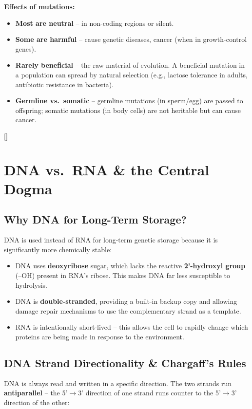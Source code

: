 \documentclass[11pt, letterpaper]{article}
\newcommand{\orangesections}{%
  \titleformat{\section}{\large\bfseries\color{sectionorange}}{}{0em}{}[\color{sectionorange}\titlerule]%
  \titleformat{\subsection}{\normalsize\bfseries\color{sectionorange!80!black}}{}{0em}{}%
}
\begin{document}
\textbf{Effects of mutations:}
\begin{itemize}[noitemsep]
  \item \textbf{Most are neutral} -- in non-coding regions or silent.
  \item \textbf{Some are harmful} -- cause genetic diseases, cancer (when in growth-control genes).
  \item \textbf{Rarely beneficial} -- the raw material of evolution. A beneficial mutation in a population can spread by natural selection (e.g., lactose tolerance in adults, antibiotic resistance in bacteria).
  \item \textbf{Germline vs.\ somatic} -- germline mutations (in sperm/egg) are passed to offspring; somatic mutations (in body cells) are not heritable but can cause cancer.
\end{itemize}




\orangesections
\section*{DNA vs.\ RNA \& the Central Dogma}

\subsection*{Why DNA for Long-Term Storage?}
DNA is used instead of RNA for long-term genetic storage because it is significantly more chemically stable:
\begin{itemize}[noitemsep]
  \item DNA uses \textbf{deoxyribose} sugar, which lacks the reactive \textbf{2'-hydroxyl group} (--OH) present in RNA's ribose. This makes DNA far less susceptible to hydrolysis.
  \item DNA is \textbf{double-stranded}, providing a built-in backup copy and allowing damage repair mechanisms to use the complementary strand as a template.
  \item RNA is intentionally short-lived -- this allows the cell to rapidly change which proteins are being made in response to the environment.
\end{itemize}

\subsection*{DNA Strand Directionality \& Chargaff's Rules}
DNA is always read and written in a specific direction. The two strands run \textbf{antiparallel} -- the 5'$\to$3' direction of one strand runs counter to the 5'$\to$3' direction of the other:
\end{document}
